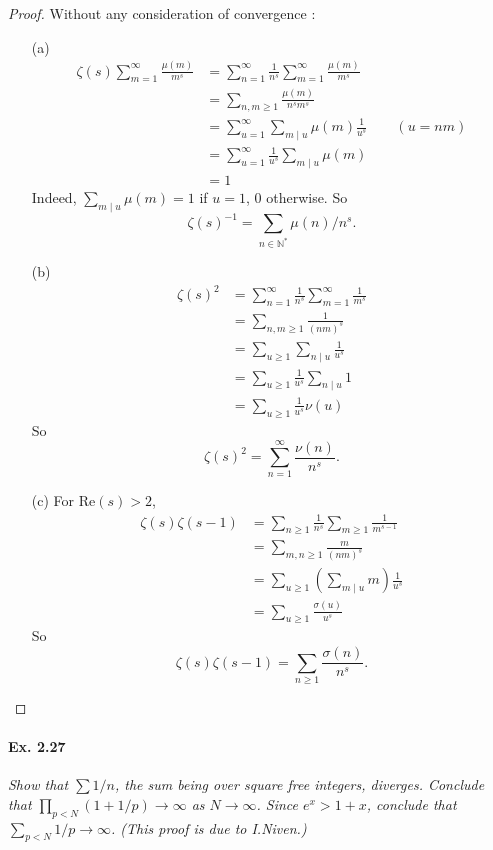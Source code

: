 \documentclass[11pt,a4paper]{article}
\newcommand{\N}{\mathbb{N}}
\begin{document}
{\begin{proof}
Without any consideration of convergence :
\begin{enumerate}
\item[(a)]
\begin{align*}
\zeta(s) \sum_{m=1}^\infty \frac{\mu(m)}{m^s} &= \sum_{n=1}^\infty \frac{1}{n^s} \sum_{m=1}^\infty \frac{\mu(m)}{m^s}\\
&=\sum_{n,m\geq 1} \frac{\mu(m)}{n^s m^s}\\
&=\sum_{u=1}^\infty \sum_{m\mid u} \mu(m) \frac{1}{u^s}\qquad (u = nm)\\
&=\sum_{u=1}^\infty \frac{1}{u^s} \sum_{m\mid u} \mu(m) \\
&=1
\end{align*}
Indeed, $\sum_{m\mid u} \mu(m) = 1$ if $u=1$, $0$ otherwise. So 
$$\zeta(s)^{-1} = \sum_{n\in \N^*} \mu(n)/n^s.$$
\item[(b)]
\begin{align*}
\zeta(s)^2 &= \sum_{n=1}^\infty \frac{1}{n^s}\sum_{m=1}^\infty \frac{1}{m^s}\\
&= \sum_{n,m\geq 1} \frac{1}{(nm)^s}\\
&=\sum_{u\geq 1} \sum_{n\mid u} \frac{1}{u^s}\\
&=\sum_{u\geq 1} \frac{1}{u^s} \sum_{n\mid u} 1\\
&= \sum_{u\geq 1} \frac{1}{u^s} \nu(u)
\end{align*}
So $$\zeta(s)^2 = \sum_{n=1}^\infty \frac{\nu(n)}{n^s}.$$
\item[(c)] For $\mathrm{Re}(s)>2$, 
\begin{align*}
\zeta(s) \zeta(s-1) &= \sum_{n\geq 1} \frac{1}{n^s}\sum_{m \geq 1} \frac{1}{m^{s-1}}\\
&=\sum_{m,n\geq 1}  \frac{m}{(nm)^s}\\
&=\sum_{u \geq 1} \left ( \sum_{m \mid u} m\right) \frac{1}{u^s}\\
&= \sum_{u\geq 1} \frac{\sigma(u)}{u^s}
\end{align*}
So
$$\zeta(s)\zeta(s-1) = \sum_{n\geq 1} \frac{\sigma(n)}{n^s}.$$
\end{enumerate}
\end{proof}

\paragraph{Ex. 2.27}

{\it Show that $\sum 1/n$, the sum being over square free integers, diverges. Conclude that $\prod_{p < N} (1+1/p) \to \infty$ as $N \to \infty$. Since $e^x > 1 + x$, conclude that $\sum_{p < N} 1/p \to \infty$.
(This proof is due to I.Niven.)
}

}
\end{document}

